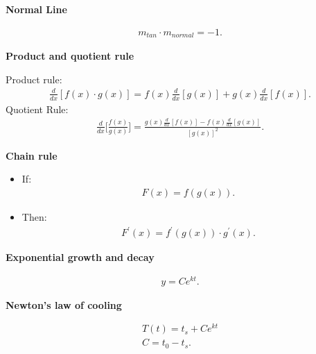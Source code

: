 \documentclass{report}
\begin{document}
    \bigbreak \noindent \bigbreak \noindent 
    \begin{large}
        \textbf{Normal Line}
    \end{large}
    \begin{align*}
        m_{tan} \cdot m_{normal } = -1
    .\end{align*}

    \bigbreak \noindent \bigbreak \noindent 
    \begin{large}
        \textbf{Product and quotient rule}
    \end{large}
    \bigbreak \noindent \bigbreak \noindent 
    Product rule:
    \begin{align*}
       \frac{d}{dx}[f(x) \cdot g(x)] = f(x) \frac{d}{dx}[g(x)] + g(x) \frac{d}{dx}[f(x)] 
    .\end{align*}
    \bigbreak \noindent \bigbreak \noindent 
    Quotient Rule:
    \begin{align*}
        \frac{d}{dx}\bigg[ \frac{f(x)}{g(x)}\bigg] = \frac{g(x) \frac{d}{dx}[f(x)] - f(x) \frac{d}{dx}[g(x)]}{[g(x)]^2}
    .\end{align*}

    \bigbreak \noindent \bigbreak \noindent 
    \begin{large}
        \textbf{Chain rule}
    \end{large}
      \begin{itemize}
          \item If:
        \begin{align*}
          F(x) = f(g(x))
        .\end{align*}
        \item Then:
        \begin{align*}
          F^{\prime}(x) = f^{\prime}(g(x)) \cdot g^{\prime}(x)
        .\end{align*}
      \end{itemize}


    \bigbreak \noindent \bigbreak \noindent 
    \begin{large}
        \textbf{Exponential growth and decay}
    \end{large}
    \begin{align*}
        y = Ce^{kt}
    .\end{align*}

    \bigbreak \noindent \bigbreak \noindent 
    \begin{large}
        \textbf{Newton's law of cooling}
    \end{large}
    \begin{align*}
        T(t) = t_{s} + Ce^{kt} \\
        C = t_{0} - t_{s}
    .\end{align*}
\end{document}
